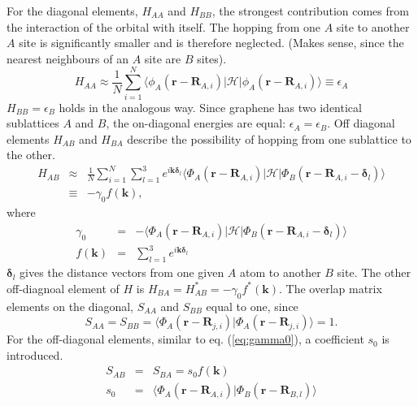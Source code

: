 For the diagonal elements, $H_{A A}$ and $H_{B B}$, the strongest contribution comes from the interaction of the orbital with itself. The hopping from one $A$ site to another $A$ site is significantly smaller and is therefore neglected. (Makes sense, since the nearest neighbours of an $A$ site are $B$ sites).
\begin{equation}
H_{A A} \approx \frac{1}{N} \sum_{i=1}^N \langle \phi_A ( \mathbf{r} - \mathbf{R}_{A, i} ) | \mathcal{H} |  \phi_A ( \mathbf{r} - \mathbf{R}_{A, i} ) \rangle \equiv \epsilon_A
\end{equation}
$H_{B B} = \epsilon_B$ holds in the analogous way. Since graphene has two identical sublattices $A$ and $B$, the on-diagonal energies are equal: $\epsilon_A = \epsilon_B$. 
Off diagonal elements $H_{A B}$ and $H_{B A}$ describe the possibility of hopping from one sublattice to the other. 
\begin{eqnarray}
H_{A B } &\approx & \frac{1}{N} \sum_{i = 1}^N \sum_{l = 1}^3 e^{i \mathbf{k} \bm{\delta}_l} \langle \Phi_A ( \mathbf{r} - \mathbf{R}_{A, i} ) | \mathcal{H} | \Phi_B ( \mathbf{r} - \mathbf{R}_{A, i} - \bm{\delta}_l ) \rangle  \\
& \equiv & - \gamma_0 f \left( \mathbf{k} \right) \label{eq:gamma0},
\end{eqnarray}
where
\begin{eqnarray}
\gamma_0 &=& - \langle \Phi_A ( \mathbf{r} - \mathbf{R}_{A, i} )| \mathcal{H} | \Phi_B ( \mathbf{r} - \mathbf{R}_{A, i} - \bm{\delta}_l ) \rangle \\
f \left( \mathbf{k} \right) &=&  \sum_{l = 1}^3 e^{i \mathbf{k} \bm{\delta}_l} 
\end{eqnarray}
$\bm{\delta}_l$ gives the distance vectors from one given $A$ atom to another $B$ site. The other off-diagnoal element of $H$ is $H_{B A} = H_{A B}^* = - \gamma_0 f^* \left( \mathbf{k} \right)$. The overlap matrix elements on the diagonal, $S_{A A}$ and $S_{B B}$ equal to one, since 
\begin{equation}
S_{A A} = S_{B B} = \langle \Phi_A ( \mathbf{r} - \mathbf{R}_{j, i} ) | \Phi_A ( \mathbf{r} - \mathbf{R}_{j, i} ) \rangle = 1.
\end{equation}
For the off-diagonal elements, similar to eq. (\ref{eq:gamma0}), a coefficient $s_0$ is introduced.
\begin{eqnarray}
S_{A B} &=& S_{B A} = s_0 f \left( \mathbf{k} \right) \\
s_0 &=& \langle \Phi_A ( \mathbf{r} - \mathbf{R}_{A, i} ) | \Phi_B ( \mathbf{r} - \mathbf{R}_{B, l} ) \rangle 
\end{eqnarray}
